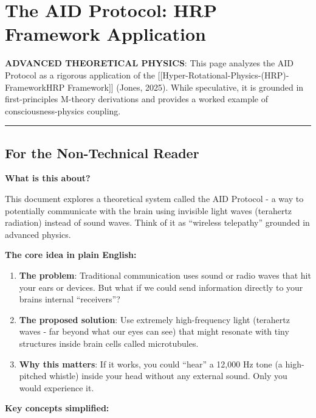 \section{The AID Protocol: HRP Framework
Application}\label{the-aid-protocol-hrp-framework-application}

\textbf{ ADVANCED THEORETICAL PHYSICS}: This page analyzes the AID
Protocol as a rigorous application of the
{[}{[}Hyper-Rotational-Physics-(HRP)-Framework\textbar HRP
Framework{]}{]} (Jones, 2025). While speculative, it is grounded in
first-principles M-theory derivations and provides a worked example of
consciousness-physics coupling.

\begin{center}\rule{0.5\linewidth}{0.5pt}\end{center}

\subsection{For the Non-Technical
Reader}\label{for-the-non-technical-reader}

\textbf{What is this about?}

This document explores a theoretical system called the AID Protocol - a
way to potentially communicate with the brain using invisible light
waves (terahertz radiation) instead of sound waves. Think of it as
``wireless telepathy'' grounded in advanced physics.

\textbf{The core idea in plain English:}

\begin{enumerate}
\def\labelenumi{\arabic{enumi}.}
\item
  \textbf{The problem}: Traditional communication uses sound or radio
  waves that hit your ears or devices. But what if we could send
  information directly to your brain\textquotesingle s internal
  ``receivers''?
\item
  \textbf{The proposed solution}: Use extremely high-frequency light
  (terahertz waves - far beyond what our eyes can see) that might
  resonate with tiny structures inside brain cells called microtubules.
\item
  \textbf{Why this matters}: If it works, you could ``hear'' a 12,000 Hz
  tone (a high-pitched whistle) inside your head without any external
  sound. Only you would experience it.
\end{enumerate}

\textbf{Key concepts simplified:}

